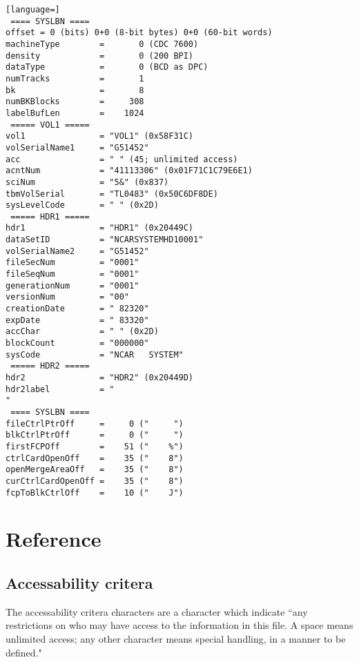 \documentclass{report}
\begin{document}
\begin{lstlisting}[language=]
 ==== SYSLBN ====
offset = 0 (bits) 0+0 (8-bit bytes) 0+0 (60-bit words)
machineType        =       0 (CDC 7600)
density            =       0 (200 BPI)
dataType           =       0 (BCD as DPC)
numTracks          =       1
bk                 =       8
numBKBlocks        =     308
labelBufLen        =    1024
 ===== VOL1 =====
vol1               = "VOL1" (0x58F31C)
volSerialName1     = "G51452"
acc                = " " (45; unlimited access)
acntNum            = "41113306" (0x01F71C1C79E6E1)
sciNum             = "5&" (0x837)
tbmVolSerial       = "TL0483" (0x50C6DF8DE)
sysLevelCode       = " " (0x2D)
 ===== HDR1 =====
hdr1               = "HDR1" (0x20449C)
dataSetID          = "NCARSYSTEMHD10001"
volSerialName2     = "G51452"
fileSecNum         = "0001"
fileSeqNum         = "0001"
generationNum      = "0001"
versionNum         = "00"
creationDate       = " 82320"
expDate            = " 83320"
accChar            = " " (0x2D)
blockCount         = "000000"
sysCode            = "NCAR   SYSTEM"
 ===== HDR2 =====
hdr2               = "HDR2" (0x20449D)
hdr2label          = "                                                                            "
 ==== SYSLBN ====
fileCtrlPtrOff     =     0 ("     ")
blkCtrlPtrOff      =     0 ("     ")
firstFCPOff        =    51 ("    %")
ctrlCardOpenOff    =    35 ("    8")
openMergeAreaOff   =    35 ("    8")
curCtrlCardOpenOff =    35 ("    8")
fcpToBlkCtrlOff    =    10 ("    J")
\end{lstlisting}

\chapter{Reference}

\section{Accessability critera} \label{Sec.AccessibilityCriteria}

The accessability critera characters are a character which indicate ``any restrictions on who may have access to the information in this file. A space means unlimited access; any other character means special handling, in a manner to be defined."

\end{document}
